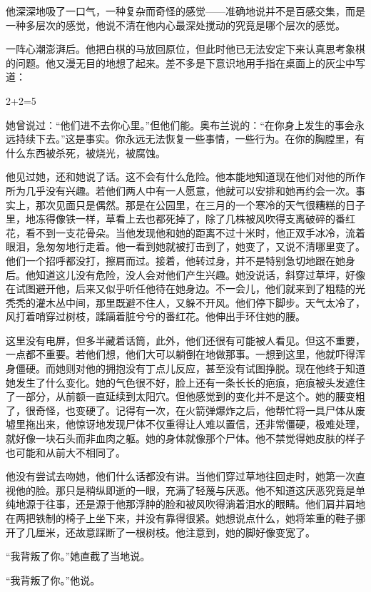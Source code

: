 他深深地吸了一口气，一种复杂而奇怪的感觉------准确地说并不是百感交集，而是一种多层次的感觉，他说不清在他内心最深处搅动的究竟是哪个层次的感觉。

一阵心潮澎湃后。他把白棋的马放回原位，但此时他已无法安定下来认真思考象棋的问题。他又漫无目的地想了起来。差不多是下意识地用手指在桌面上的灰尘中写道：

2+2=5

她曾说过：``他们进不去你心里。''但他们能。奥布兰说的：``在你身上发生的事会永远持续下去。''这是事实。你永远无法恢复一些事情，一些行为。在你的胸膛里，有什么东西被杀死，被烧光，被腐蚀。

他见过她，还和她说了话。这不会有什么危险。他本能地知道现在他们对他的所作所为几乎没有兴趣。若他们两人中有一人愿意，他就可以安排和她再约会一次。事实上，那次见面只是偶然。那是在公园里，在三月的一个寒冷的天气很糟糕的日子里，地冻得像铁一样，草看上去也都死掉了，除了几株被风吹得支离破碎的番红花，看不到一支花骨朵。当他发现他和她的距离不过十米时，他正双手冰冷，流着眼泪，急匆匆地行走着。他一看到她就被打击到了，她变了，又说不清哪里变了。他们一个招呼都没打，擦肩而过。接着，他转过身，并不是特别急切地跟在她身后。他知道这儿没有危险，没人会对他们产生兴趣。她没说话，斜穿过草坪，好像在试图避开他，后来又似乎听任他待在她身边。不一会儿，他们就来到了粗糙的光秃秃的灌木丛中间，那里既避不住人，又躲不开风。他们停下脚步。天气太冷了，风打着哨穿过树枝，蹂躏着脏兮兮的番红花。他伸出手环住她的腰。

这里没有电屏，但多半藏着话筒，此外，他们还很有可能被人看见。但这不重要，一点都不重要。若他们想，他们大可以躺倒在地做那事。一想到这里，他就吓得浑身僵硬。而她则对他的拥抱没有丁点儿反应，甚至没有试图挣脱。现在他终于知道她发生了什么变化。她的气色很不好，脸上还有一条长长的疤痕，疤痕被头发遮住了一部分，从前额一直延续到太阳穴。但他感觉到的变化并不是这个。她的腰变粗了，很奇怪，也变硬了。记得有一次，在火箭弹爆炸之后，他帮忙将一具尸体从废墟里拖出来，他惊讶地发现尸体不仅重得让人难以置信，还非常僵硬，极难处理，就好像一块石头而非血肉之躯。她的身体就像那个尸体。他不禁觉得她皮肤的样子也可能和从前大不相同了。

他没有尝试去吻她，他们什么话都没有讲。当他们穿过草地往回走时，她第一次直视他的脸。那只是稍纵即逝的一眼，充满了轻蔑与厌恶。他不知道这厌恶究竟是单纯地源于往事，还是源于他那浮肿的脸和被风吹得淌着泪水的眼睛。他们肩并肩地在两把铁制的椅子上坐下来，并没有靠得很紧。她想说点什么，她将笨重的鞋子挪开了几厘米，还故意踩断了一根树枝。他注意到，她的脚好像变宽了。

``我背叛了你。''她直截了当地说。

``我背叛了你。''他说。

